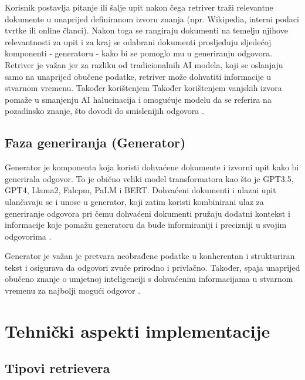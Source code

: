 \documentclass[]{foi}
\begin{document}
Korisnik postavlja pitanje ili šalje upit nakon čega retriver traži relevantne dokumente u unaprijed definiranom izvoru znanja (npr. Wikipedia, interni podaci tvrtke ili online članci).
Nakon toga se rangiraju dokumenti na temelju njihove relevantnosti za upit i za kraj se odabrani dokumenti prosljeđuju sljedećoj komponenti - generatoru - kako bi se pomoglo mu u generiranju odgovora.
Retriver je važan jer za razliku od tradicionalnih AI modela, koji se oslanjaju samo na unaprijed obučene podatke, retriver može dohvatiti informacije u stvarnom vremenu. Također korištenjem
Također korištenjem vanjskih izvora pomaže u smanjenju AI halucinacija i omogućuje modelu da se referira na pozadinsko znanje, što dovodi do smislenijih odgovora \cite{shaheryar2025}.




\subsection{Faza generiranja (Generator)}

Generator je komponenta koja koristi dohvaćene dokumente i izvorni upit kako bi generirala odgovor. To je obično veliki model transformatora kao što je GPT3.5, GPT4, Llama2, Falcpm, PaLM i BERT.
Dohvaćeni dokumenti i ulazni upit ulančavaju se i unose u generator, koji zatim koristi kombinirani ulaz za generiranje odgovora pri čemu dohvaćeni dokumenti pružaju dodatni kontekst i informacije 
koje pomažu generatoru da bude informiraniji i precizniji u svojim odgovorima \cite{redis2025}. 

Generator je važan je pretvara neobrađene podatke u konherentan i strukturiran tekst i osigurava da odgovori zvuče prirodno i privlačno. Također, spaja unaprijed obučeno znanje o umjetnoj inteligenciji
s dohvaćenim informacijama u stvarnom vremenu za najbolji mogući odgovor \cite{shaheryar2025}. 

\section{Tehnički aspekti implementacije}
\subsection{Tipovi retrievera}
\end{document}
